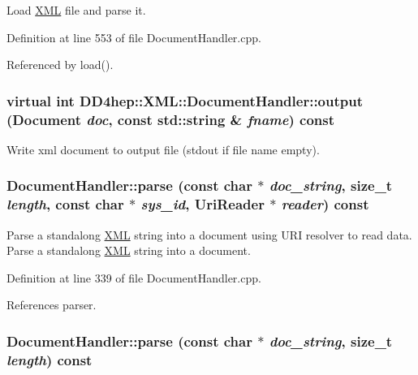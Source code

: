 Load \hyperlink{namespace_d_d4hep_1_1_x_m_l}{XML} file and parse it. 

Definition at line 553 of file DocumentHandler.cpp.

Referenced by load().\hypertarget{class_d_d4hep_1_1_x_m_l_1_1_document_handler_aa107a6939a97904b84309abacef28c8c}{
\subsubsection[{output}]{\setlength{\rightskip}{0pt plus 5cm}virtual int DD4hep::XML::DocumentHandler::output ({\bf Document} {\em doc}, \/  const std::string \& {\em fname}) const}}
\label{class_d_d4hep_1_1_x_m_l_1_1_document_handler_aa107a6939a97904b84309abacef28c8c}


Write xml document to output file (stdout if file name empty). \hypertarget{class_d_d4hep_1_1_x_m_l_1_1_document_handler_a39f419422678d5dedace298e6b964b49}{
\subsubsection[{parse}]{ DocumentHandler::parse (const char $\ast$ {\em doc\_\-string}, \/  size\_\-t {\em length}, \/  const char $\ast$ {\em sys\_\-id}, \/  {\bf UriReader} $\ast$ {\em reader}) const}}
\label{class_d_d4hep_1_1_x_m_l_1_1_document_handler_a39f419422678d5dedace298e6b964b49}


Parse a standalong \hyperlink{namespace_d_d4hep_1_1_x_m_l}{XML} string into a document using URI resolver to read data. Parse a standalong \hyperlink{namespace_d_d4hep_1_1_x_m_l}{XML} string into a document. 

Definition at line 339 of file DocumentHandler.cpp.

References parser.\hypertarget{class_d_d4hep_1_1_x_m_l_1_1_document_handler_a81fd8a96ea381b6822ec360dcf62e38a}{
\subsubsection[{parse}]{ DocumentHandler::parse (const char $\ast$ {\em doc\_\-string}, \/  size\_\-t {\em length}) const}}
\label{class_d_d4hep_1_1_x_m_l_1_1_document_handler_a81fd8a96ea381b6822ec360dcf62e38a}



